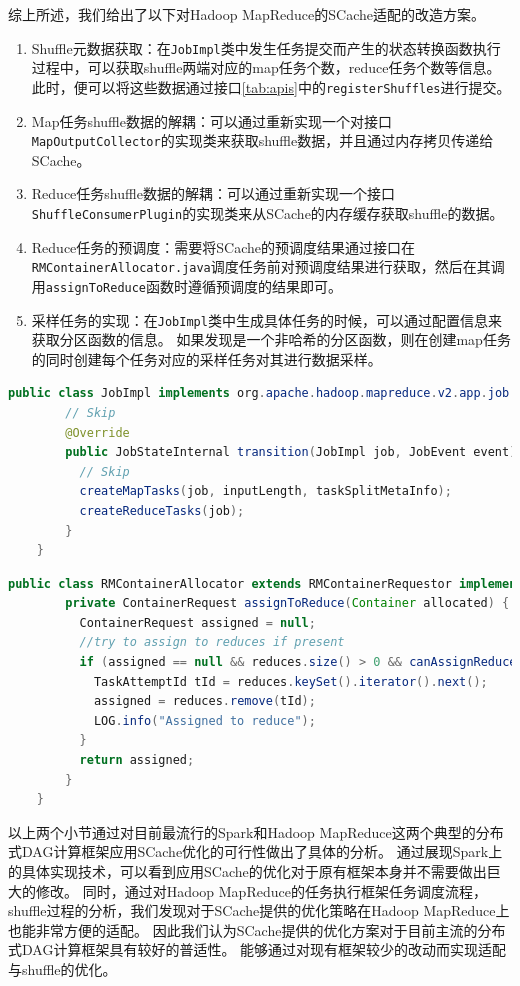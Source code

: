 综上所述，我们给出了以下对Hadoop MapReduce的SCache适配的改造方案。
\begin{enumerate}
    \item Shuffle元数据获取：在\verb|JobImpl|类中发生任务提交而产生的状态转换函数执行过程中，可以获取shuffle两端对应的map任务个数，reduce任务个数等信息。
    此时，便可以将这些数据通过接口\ref{tab:apis}中的\verb|registerShuffles|进行提交。
    \item Map任务shuffle数据的解耦：可以通过重新实现一个对接口\verb|MapOutputCollector|的实现类来获取shuffle数据，并且通过内存拷贝传递给SCache。
    \item Reduce任务shuffle数据的解耦：可以通过重新实现一个接口\verb|ShuffleConsumerPlugin|的实现类来从SCache的内存缓存获取shuffle的数据。
    \item Reduce任务的预调度：需要将SCache的预调度结果通过接口在\verb|RMContainerAllocator.java|调度任务前对预调度结果进行获取，然后在其调用\verb|assignToReduce|函数时遵循预调度的结果即可。
    \item 采样任务的实现：在\verb|JobImpl|类中生成具体任务的时候，可以通过配置信息来获取分区函数的信息。
    如果发现是一个非哈希的分区函数，则在创建map任务的同时创建每个任务对应的采样任务对其进行数据采样。
\end{enumerate}

\begin{lstlisting}[language={Java}, caption={Hadoop MapReduce中shuffle元数据生成代码片段}, label={code:hadoopshuffle}]
    public class JobImpl implements org.apache.hadoop.mapreduce.v2.app.job.Job, EventHandler<JobEvent> {
        // Skip
        @Override
        public JobStateInternal transition(JobImpl job, JobEvent event) {
          // Skip
          createMapTasks(job, inputLength, taskSplitMetaInfo);
          createReduceTasks(job);
        }
    }
\end{lstlisting}

\begin{lstlisting}[language={Java}, caption={Hadoop MapReduce中reduce任务调度代码片段}, label={code:hadoopschedule}]
    public class RMContainerAllocator extends RMContainerRequestor implements ContainerAllocator {
        private ContainerRequest assignToReduce(Container allocated) {
          ContainerRequest assigned = null;
          //try to assign to reduces if present
          if (assigned == null && reduces.size() > 0 && canAssignReduces()) {
            TaskAttemptId tId = reduces.keySet().iterator().next();
            assigned = reduces.remove(tId);
            LOG.info("Assigned to reduce");
          }
          return assigned;
        }
    }
\end{lstlisting}

以上两个小节通过对目前最流行的Spark和Hadoop MapReduce这两个典型的分布式DAG计算框架应用SCache优化的可行性做出了具体的分析。
通过展现Spark上的具体实现技术，可以看到应用SCache的优化对于原有框架本身并不需要做出巨大的修改。
同时，通过对Hadoop MapReduce的任务执行框架任务调度流程，shuffle过程的分析，我们发现对于SCache提供的优化策略在Hadoop MapReduce上也能非常方便的适配。
因此我们认为SCache提供的优化方案对于目前主流的分布式DAG计算框架具有较好的普适性。
能够通过对现有框架较少的改动而实现适配与shuffle的优化。
